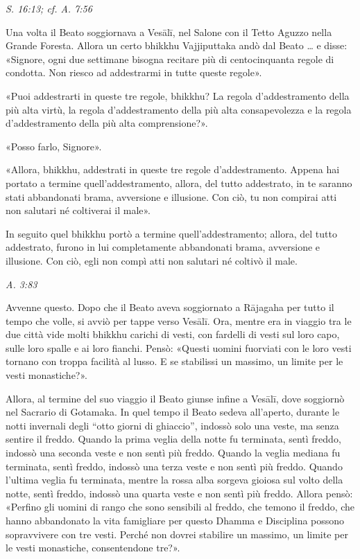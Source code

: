 \emph{S. 16:13; cf. A. 7:56}


Una volta il Beato soggiornava a Vesālī, nel Salone con il Tetto Aguzzo
nella Grande Foresta. Allora un certo bhikkhu Vajjiputtaka andò dal
Beato … e disse: «Signore, ogni due settimane bisogna recitare più di
centocinquanta regole di condotta. Non riesco ad addestrarmi in tutte
queste regole».


«Puoi addestrarti in queste tre regole, bhikkhu? La regola
d’addestramento della più alta virtù, la regola d’addestramento della
più alta consapevolezza e la regola d’addestramento della più alta
comprensione?».


«Posso farlo, Signore».


«Allora, bhikkhu, addestrati in queste tre regole d’addestramento.
Appena hai portato a termine quell’addestramento, allora, del tutto
addestrato, in te saranno stati abbandonati brama, avversione e
illusione. Con ciò, tu non compirai atti non salutari né coltiverai il
male».


In seguito quel bhikkhu portò a termine quell’addestramento; allora, del
tutto addestrato, furono in lui completamente abbandonati brama,
avversione e illusione. Con ciò, egli non compì atti non salutari né
coltivò il male.


\emph{A. 3:83}


 Avvenne questo. Dopo che il Beato aveva soggiornato a
Rājagaha per tutto il tempo che volle, si avviò per tappe verso Vesālī.
Ora, mentre era in viaggio tra le due città vide molti bhikkhu carichi
di vesti, con fardelli di vesti sul loro capo, sulle loro spalle e ai
loro fianchi. Pensò: «Questi uomini fuorviati con le loro vesti tornano
con troppa facilità al lusso. E se stabilissi un massimo, un limite per
le vesti monastiche?».


Allora, al termine del suo viaggio il Beato giunse infine a Vesālī, dove
soggiornò nel Sacrario di Gotamaka. In quel tempo il Beato sedeva
all’aperto, durante le notti invernali degli “otto giorni di ghiaccio”,
indossò solo una veste, ma senza sentire il freddo. Quando la prima
veglia della notte fu terminata, sentì freddo, indossò una seconda veste
e non sentì più freddo. Quando la veglia mediana fu terminata, sentì
freddo, indossò una terza veste e non sentì più freddo. Quando l’ultima
veglia fu terminata, mentre la rossa alba sorgeva gioiosa sul volto
della notte, sentì freddo, indossò una quarta veste e non sentì più
freddo. Allora pensò: «Perfino gli uomini di rango che sono sensibili al
freddo, che temono il freddo, che hanno abbandonato la vita famigliare
per questo Dhamma e Disciplina possono sopravvivere con tre vesti.
Perché non dovrei stabilire un massimo, un limite per le vesti
monastiche, consentendone tre?».


